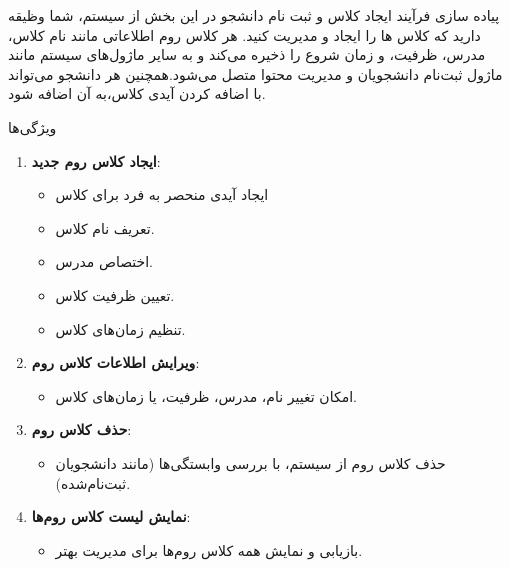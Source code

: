 

{پیاده سازی فرآیند ایجاد کلاس و ثبت نام دانشجو}
در این بخش از سیستم، شما وظیقه دارید که کلاس ها را ایجاد و مدیریت کنید. هر کلاس روم اطلاعاتی مانند نام کلاس، مدرس، ظرفیت، و زمان شروع را ذخیره می‌کند و به سایر ماژول‌های سیستم مانند ماژول ثبت‌نام دانشجویان و مدیریت محتوا متصل می‌شود.همچنین هر دانشجو می‌تواند با اضافه کردن آیدی کلاس،به آن اضافه شود.

{ویژگی‌ها}
\begin{enumerate}
    \item \textbf{ایجاد کلاس روم جدید}:
    \begin{itemize}
        \item ایجاد آیدی منحصر به فرد برای کلاس
        \item تعریف نام کلاس.
        \item اختصاص مدرس.
        \item تعیین ظرفیت کلاس.
        \item تنظیم زمان‌های کلاس.
    \end{itemize}
    \item \textbf{ویرایش اطلاعات کلاس روم}:
    \begin{itemize}
        \item امکان تغییر نام، مدرس، ظرفیت، یا زمان‌های کلاس.
    \end{itemize}
    \item \textbf{حذف کلاس روم}:
    \begin{itemize}
        \item حذف کلاس روم از سیستم، با بررسی وابستگی‌ها (مانند دانشجویان ثبت‌نام‌شده).
    \end{itemize}
    \item \textbf{نمایش لیست کلاس روم‌ها}:
    \begin{itemize}
        \item بازیابی و نمایش همه کلاس روم‌ها برای مدیریت بهتر.
    \end{itemize}
\end{enumerate}
